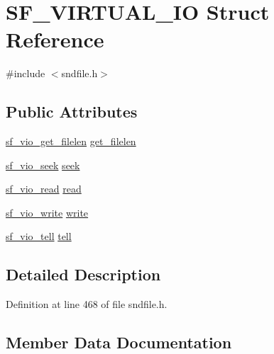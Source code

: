 \hypertarget{struct_s_f___v_i_r_t_u_a_l___i_o}{}\section{S\+F\+\_\+\+V\+I\+R\+T\+U\+A\+L\+\_\+\+IO Struct Reference}
\label{struct_s_f___v_i_r_t_u_a_l___i_o}


{\ttfamily \#include $<$sndfile.\+h$>$}

\subsection*{Public Attributes}
\begin{DoxyCompactItemize}
\item 
\hyperlink{win_2_projects_2libsndfile_2sndfile_8h_a2166198457fe4e852ef10804b2c1e8a1}{sf\+\_\+vio\+\_\+get\+\_\+filelen} \hyperlink{struct_s_f___v_i_r_t_u_a_l___i_o_ab4ab3640c28c30b60059c2be2b734057}{get\+\_\+filelen}
\item 
\hyperlink{win_2_projects_2libsndfile_2sndfile_8h_ad23e218718c16eae24b98d41976ac5d2}{sf\+\_\+vio\+\_\+seek} \hyperlink{struct_s_f___v_i_r_t_u_a_l___i_o_aa8ac1ef2302a43acca58a02e809a815f}{seek}
\item 
\hyperlink{win_2_projects_2libsndfile_2sndfile_8h_a90c34518e3de9fbed3611b030e17dba7}{sf\+\_\+vio\+\_\+read} \hyperlink{struct_s_f___v_i_r_t_u_a_l___i_o_af5fbdef0ac173a604b2dff50f210982a}{read}
\item 
\hyperlink{win_2_projects_2libsndfile_2sndfile_8h_aa1b1f82878422da550bfd70f2be3ded3}{sf\+\_\+vio\+\_\+write} \hyperlink{struct_s_f___v_i_r_t_u_a_l___i_o_ac99aed00fed47ac8817332e208a8cb4a}{write}
\item 
\hyperlink{win_2_projects_2libsndfile_2sndfile_8h_a457595d4cdaf505525ff421aebe6eb5d}{sf\+\_\+vio\+\_\+tell} \hyperlink{struct_s_f___v_i_r_t_u_a_l___i_o_ac40bf7a24e909f0ebec62fab7c0321b2}{tell}
\end{DoxyCompactItemize}


\subsection{Detailed Description}


Definition at line 468 of file sndfile.\+h.



\subsection{Member Data Documentation}
